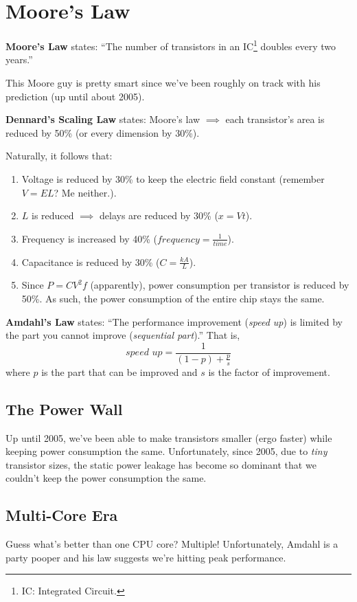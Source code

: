 \documentclass{report}
\newcommand{\definition}[2]{\begin{tcolorbox}[title={Definition: #1}]{#2}\end{tcolorbox}}
\begin{document}
\section{Moore's Law}
\definition{Moore's Law}{
  \textbf{Moore's Law} states: ``The number of transistors in an IC\footnote{IC: Integrated
    Circuit.} doubles every two years.''
}

This Moore guy is pretty smart since we've been roughly on track with his prediction (up until about
2005).

\definition{Dennard's Scaling Law}{
  \textbf{Dennard's Scaling Law} states: Moore's law $\implies$ each transistor's area is
  reduced by 50\% (or every dimension by 30\%).
}

Naturally, it follows that:
\begin{enumerate}[label=\textit{(\roman*)}] 
\item Voltage is reduced by 30\% to keep the electric field constant (remember $V = EL$? Me
  neither.).
\item $L$ is reduced $\implies$ delays are reduced by 30\% ($x = Vt$).
\item Frequency is increased by 40\% ($\textit{frequency} = \frac{1}{\textit{time}}$).
\item Capacitance is reduced by 30\% ($C = \frac{kA}{L}$).
\item Since $P = CV^2f$ (apparently), power consumption per transistor is reduced by 50\%. As such,
  the power consumption of the entire chip stays the same.
\end{enumerate}

\definition{Amdahl's Law}{
  \textbf{Amdahl's Law} states: ``The performance improvement (\textit{speed up}) is limited by the
  part you cannot improve (\textit{sequential part}).'' That is,
  \[\textit{speed up} = \frac{1}{(1 - p) + \frac{p}{s}}\]
  where $p$ is the part that can be improved and $s$ is the factor of improvement.
}


\subsection{The Power Wall}
Up until 2005, we've been able to make transistors smaller (ergo faster) while keeping power
consumption the same. Unfortunately, since 2005, due to \textit{tiny} transistor sizes, the static
power leakage has become so dominant that we couldn't keep the power consumption the same. 


\subsection{Multi-Core Era}
Guess what's better than one CPU core? Multiple! Unfortunately, Amdahl is a party pooper and his law
suggests we're hitting peak performance.
\end{document}
